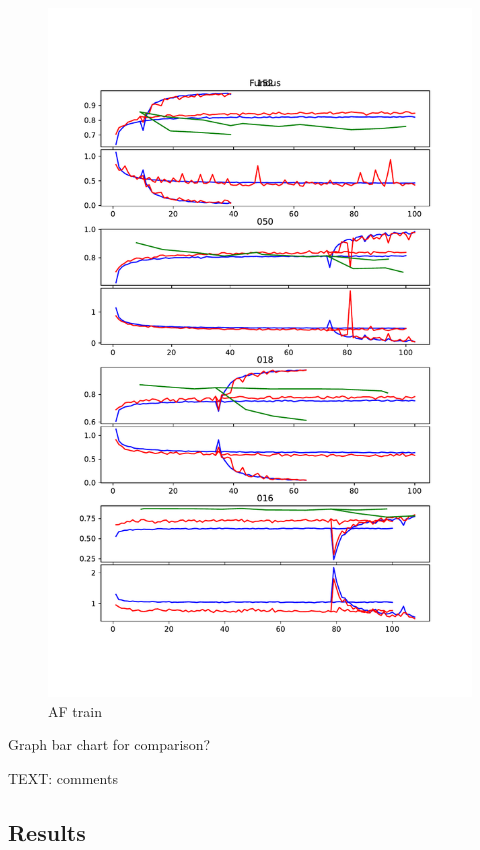 \documentclass{article}
\begin{document}
	\begin{figure}[htbp]
		\centering
		\includegraphics[width=\linewidth]{Figs/abnormity_Fundus_loss_and_acc.pdf}
		\caption{AF train}
		\vspace{0.3cm}
		\label{fig:AF_train}
	\end{figure}
	
	Graph bar chart for comparison? 
	
	TEXT: comments
	
	\subsection{Results}
	
\end{document}
